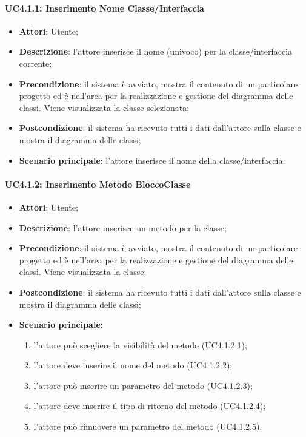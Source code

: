 \paragraph{UC4.1.1: Inserimento Nome Classe/Interfaccia}
\label{UC4.1.1}
\begin{itemize}
	\item \textbf{Attori}: Utente;
	\item \textbf{Descrizione}: l'attore inserisce il nome (univoco) per la classe/interfaccia corrente;
	\item \textbf{Precondizione}: il sistema è avviato, mostra il contenuto di un particolare progetto ed è nell'area per la realizzazione e gestione del diagramma delle classi. Viene visualizzata la classe selezionata;
	\item \textbf{Postcondizione}: il sistema ha ricevuto tutti i dati dall'attore sulla classe e mostra il diagramma delle classi;
	\item \textbf{Scenario principale}: l'attore inserisce il nome della classe/interfaccia.
\end{itemize}


\paragraph{UC4.1.2: Inserimento Metodo BloccoClasse}
\label{UC4.1.2}
\begin{itemize}
	\item \textbf{Attori}: Utente;
	\item \textbf{Descrizione}: l'attore inserisce un metodo per la classe;
	\item \textbf{Precondizione}:  il sistema è avviato, mostra il contenuto di un particolare progetto ed è nell'area per la realizzazione e gestione del diagramma delle classi. Viene visualizzata la classe;
	\item \textbf{Postcondizione}: il sistema ha ricevuto tutti i dati dall'attore sulla classe e mostra il diagramma delle classi;
	\item \textbf{Scenario principale}:
	\begin{enumerate}
		\item l'attore può scegliere la visibilità del metodo (UC4.1.2.1);
		\item l'attore deve inserire il nome del metodo (UC4.1.2.2);
		\item l'attore può inserire un parametro del metodo (UC4.1.2.3);
		\item l'attore deve inserire il tipo di ritorno del metodo (UC4.1.2.4);
		\item l'attore può rimuovere un parametro del metodo (UC4.1.2.5).
	\end{enumerate}
\end{itemize}

